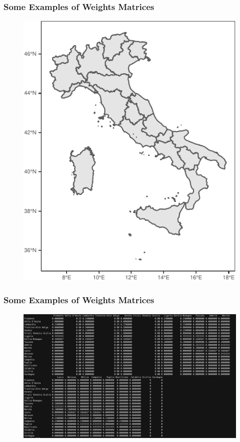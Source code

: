 \documentclass[
  shownotes,
  xcolor={svgnames},
  hyperref={colorlinks,citecolor=DarkBlue,linkcolor=DarkRed,urlcolor=DarkBlue}
  ]{beamer}
\begin{document}
\begin{frame}[fragile]
\frametitle{Some Examples of Weights Matrices}


  \begin{figure}[H] \centering
    \captionsetup{justification=centering}
    \includegraphics[scale=0.6]{figures/italia.pdf}
   \end{figure}

\end{frame}

\begin{frame}[fragile]
\frametitle{Some Examples of Weights Matrices}


  \begin{figure}[H] \centering
    \captionsetup{justification=centering}
    \includegraphics[scale=0.3]{figures/mat_italia}
   \end{figure}


\end{frame}
\end{document}

